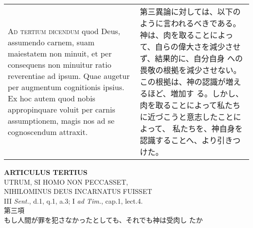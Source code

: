 \documentclass[10pt]{jsarticle} %
\begin{document}
\begin{longtable}{p{21em}p{21em}}
\\

{\scshape Ad tertium dicendum} quod Deus, assumendo carnem, suam
 maiestatem non minuit, et per consequens non minuitur ratio reverentiae
 ad ipsum. Quae augetur per augmentum cognitionis ipsius. Ex hoc autem
 quod nobis appropinquare voluit per carnis assumptionem, magis nos ad
 se cognoscendum attraxit.


&


第三異論に対しては、以下のように言われるべきである。
神は、肉を取ることによって、自らの偉大さを減少させず、結果的に、自分自身
 への畏敬の根拠を減少させない。この根拠は、神の認識が増えるほど、増加す
 る。しかし、肉を取ることによって私たちに近づこうと意志したことによって、
 私たちを、神自身を認識することへ、より引きつけた。




\end{longtable}

\newpage



\begin{center}
 {\Large {\bf ARTICULUS TERTIUS}}\\
 {\large UTRUM, SI HOMO NON PECCASSET,\\ NIHILOMINUS DEUS INCARNATUS FUISSET}\\
 {\footnotesize III {\itshape Sent.}, d.1, q.1, a.3; I {\itshape ad
 Tim.}, cap.1, lect.4.}\\
 {\Large 第三項\\もし人間が罪を犯さなかったとしても、それでも神は受肉し
 たか}
\end{center}
\end{document}
